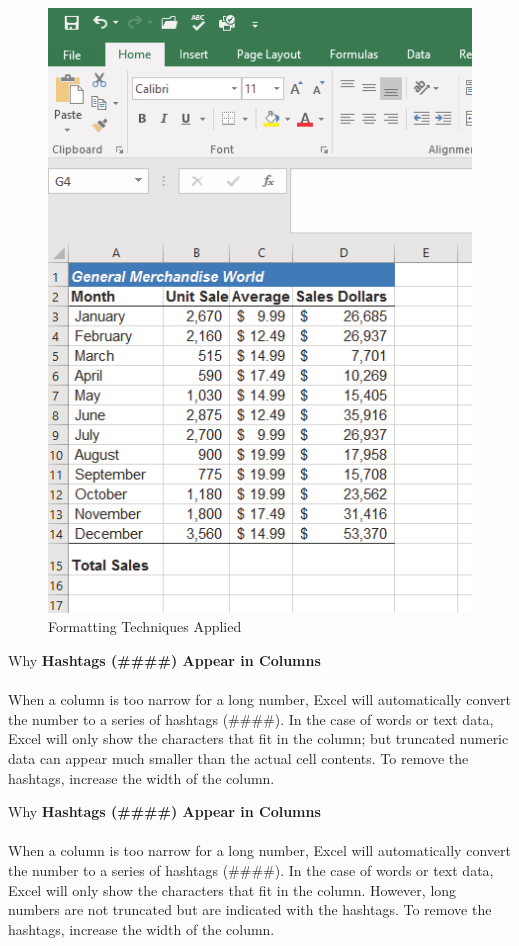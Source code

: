\begin{figure}[H]
	\centering
	\includegraphics[width=\maxwidth{.95\linewidth}]{gfx/ch01_fig37}
	\caption{Formatting Techniques Applied}
	\label{01:fig37}
\end{figure}

\begin{center}
	\begin{infobox}{Why}
		\textbf{Hashtags (\#\#\#\#) Appear in Columns}
		\\
		\\
		When a column is too narrow for a long number, Excel will automatically convert the number to a series of hashtags (\#\#\#\#). In the case of words or text data, Excel will only show the characters that fit in the column; but truncated numeric data can appear much smaller than the actual cell contents. To remove the hashtags, increase the width of the column.
	\end{infobox}
\end{center}

\begin{center}
	\begin{infobox}{Why}
		\textbf{Hashtags (\#\#\#\#) Appear in Columns}
		\\
		\\
		When a column is too narrow for a long number, Excel will automatically convert the number to a series of hashtags (\#\#\#\#). In the case of words or text data, Excel will only show the characters that fit in the column. However, long numbers are not truncated but are indicated with the hashtags. To remove the hashtags, increase the width of the column.
	\end{infobox}
\end{center}


